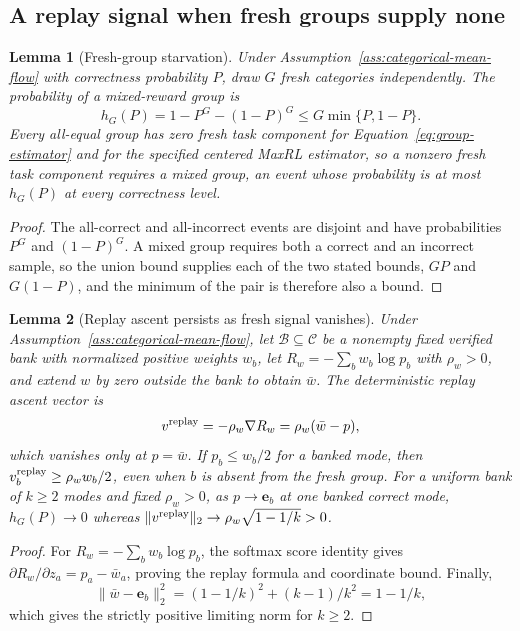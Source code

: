 \documentclass{article}
\newcommand{\1}{\mathbf 1}
\newtheorem{lemma}{Lemma}[section]
\theoremstyle{remark}
\theoremstyle{definition}
\theoremstyle{plain}
\begin{document}
\subsection{A replay signal when fresh groups supply none}
\label{app:theory-gradient-availability}

\begin{lemma}[Fresh-group starvation]
\label{lem:replay-gradient-availability}
Under Assumption~\ref{ass:categorical-mean-flow} with correctness probability
$P$, draw $G$ fresh categories independently. The probability of a
mixed-reward group is
\[
 h_G(P)=1-P^G-(1-P)^G\le G\min\{P,1-P\}.
\]
Every all-equal group has zero fresh task component for
Equation~\eqref{eq:group-estimator} and for the specified centered MaxRL
estimator, so a nonzero fresh task component requires a mixed group, an event
whose probability is at most $h_G(P)$ at every correctness level.
\end{lemma}

\begin{proof}
The all-correct and all-incorrect events are disjoint and have probabilities
$P^G$ and $(1-P)^G$. A mixed group requires both a correct and an incorrect
sample, so the union bound supplies each of the two stated bounds, $GP$ and
$G(1-P)$, and the minimum of the pair is therefore also a bound.
\end{proof}

\begin{lemma}[Replay ascent persists as fresh signal vanishes]
\label{lem:replay-ascent}
Under Assumption~\ref{ass:categorical-mean-flow}, let
$\mathcal B\subseteq\mathcal C$ be a nonempty fixed verified bank with
normalized positive weights $w_b$, let $R_w=-\sum_b w_b\log p_b$ with
$\rho_w>0$, and extend $w$ by zero outside the bank to obtain $\bar w$. The
deterministic replay ascent vector is
\[
 v^{\rm replay}=-\rho_w\nabla R_w=\rho_w(\bar w-p),
\]
which vanishes only at $p=\bar w$. If $p_b\le w_b/2$ for a banked mode, then
$v^{\rm replay}_b\ge\rho_w w_b/2$, even when $b$ is absent from the fresh
group. For a uniform bank of $k\ge2$ modes and fixed $\rho_w>0$, as
$p\to\mathbf e_b$ at one banked correct mode, $h_G(P)\to0$ whereas
$\|v^{\rm replay}\|_2\to\rho_w\sqrt{1-1/k}>0$.
\end{lemma}

\begin{proof}
For $R_w=-\sum_b w_b\log p_b$, the softmax score identity gives
$\partial R_w/\partial z_a=p_a-\bar w_a$, proving the replay formula and
coordinate bound. Finally,
\[
 \|\bar w-\mathbf e_b\|_2^2=(1-1/k)^2+(k-1)/k^2=1-1/k,
\]
which gives the strictly positive limiting norm for $k\ge2$.
\end{proof}
\end{document}
